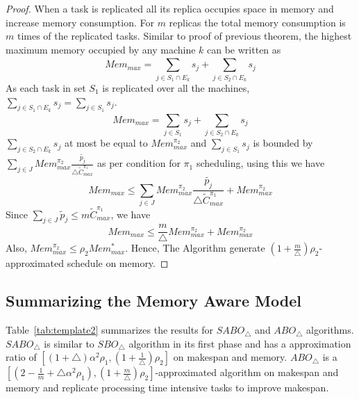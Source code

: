 \documentclass[twocolumn]{svjour3}
\begin{document}
\begin{proof}           
  When a task is replicated all its replica occupies space in memory
  and increase memory consumption. For $m$ replicas the total memory
  consumption is $m$ times of the replicated tasks. Similar to proof
  of previous theorem, the highest maximum memory occupied by any
  machine $k$ can be written as
  \begin{equation}\nonumber
    Mem_{max}= \sum_{j \in S_1\cap E_k}^{}s_j+\sum_{j \in S_2\cap E_k}^{}s_j           
  \end{equation}
  As each task in set $S_1$ is replicated over all the
  machines,$\sum\limits _{j \in S_1\cap E_k}^{}s_j =\sum\limits _{j
    \in S_1}^{}s_j$.
  \begin{equation}\nonumber
    Mem_{max} = \sum_{j\in S_1}^{}s_j+\sum_{j \in S_2\cap E_k}^{}s_j           
  \end{equation}    
  $\sum\limits_{j \in S_2\cap E_k}^{}s_j$ at most be equal to
  $Mem^{\pi_2}_{max} $ and $\sum\limits_{j\in S_1}s_j$ is bounded by
  $\sum\limits_{j \in J}^{} {Mem^{\pi_2}_{max}}
  \frac{\tilde{p_j}}{\triangle \tilde{C}^{\pi_1}_{max}} $ as per
  condition for $\pi_1$ scheduling, using this we have
  \begin{equation}\nonumber
    Mem_{max}\leq \sum_{j \in J}^{} {Mem^{\pi_2}_{max}} \frac{\tilde{p_j}}{\triangle \tilde{C}^{\pi_1}_{max}}+{Mem^{\pi_2}_{max}}
  \end{equation}
  Since $ \sum\limits_{j \in J}\tilde{p}_j \leq m\tilde{C}^{\pi_1}_{max} $, we have 
  \begin{equation}\nonumber
    Mem_{max}\leq   \frac{m}{\triangle}{Mem^{\pi_2}_{max}}+{Mem^{\pi_2}_{max}}
  \end{equation}
  Also,  ${Mem^{\pi_2}_{max}} \leq \rho_2 {Mem^{*}_{max}}$.  Hence, The Algorithm generate $ (1+\frac{m}{\triangle})\rho_2 $- approximated schedule on memory.
\end{proof}
                  
\subsection{Summarizing the Memory Aware Model}
Table~\ref{tab:template2} summarizes the results for $SABO_\triangle$
and $ABO_\triangle$ algorithms. $SABO_\triangle$ is similar to $
SBO_\triangle$ algorithm in its first phase and has a approximation
ratio of $[(1+\triangle)\alpha^2 \rho_1,
(1+\frac{1}{\triangle})\rho_2]$ on makespan and memory.
$ABO_\triangle$ is a $ [(2-\frac{1}{m}+\triangle\alpha^2 \rho_1),
(1+\frac{m}{\triangle})\rho_2] $-approximated algorithm on makespan
and memory and replicate processing time intensive tasks to improve
makespan.
     
\end{document}
